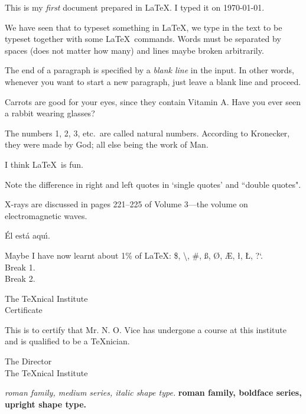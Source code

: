 \documentclass{article}
\begin{document}
This is my \emph{first} document prepared in \LaTeX.
I typed it on \today.

We have seen that to typeset something in \LaTeX, we type in the
text to be typeset together with some \LaTeX\ commands.
Words must be separated by spaces (does not matter how many)
and lines maybe broken arbitrarily.

\noindent The end of a paragraph is specified by a \emph{blank line}
in the input. In other words, whenever you want to start a new
paragraph, just leave a blank line and proceed.

Carrots are good for your eyes, since they contain Vitamin A\@.
Have you ever seen a rabbit wearing glasses?

The numbers 1, 2, 3, etc.\ are called natural numbers.
According to Kronecker, they were made by God; all else being the work of Man.

I think \LaTeX\ is fun.

Note the difference in right and left quotes in `single quotes' and ``double quotes".

X-rays are discussed in pages 221--225 of Volume 3---the volume on
electromagnetic waves.

\'{E}l est\'{a} aqu\'{\i}.

Maybe I have now learnt about 1\% of \LaTeX :
\$, \textbackslash, \#, \ss, \O, \AE, \l, \L, ?`.\\
Break 1.\\[10pt] Break 2. %

\begin{center}
The \TeX nical Institute\\[.75cm]
Certificate
\end{center}
\noindent This is to certify that Mr. N. O. Vice has undergone a
course at this institute and is qualified to be a \TeX nician.
\begin{flushright}
The Director\\
The \TeX nical Institute
\end{flushright}

\textit{roman family, medium series, italic shape type.}
\textbf{roman family, boldface series, upright shape type.}
\end{document}
